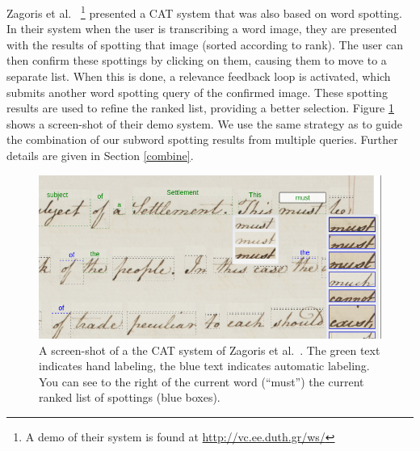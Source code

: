 \documentclass[ms,electronic,twosidetoc,letterpaper,chaptercenter,parttop,lof,lot]{byumsphd}
\begin{document}
Zagoris et al.~\cite{Zagoris2015} \footnote{A demo of their system is found at \url{http://vc.ee.duth.gr/ws/}} presented a CAT system that was also based on word spotting. In their system when the user is transcribing a word image, they are presented with the results of spotting that image (sorted according to rank). The user can then confirm these spottings by clicking on them, causing them to move to a separate list. When this is done, a relevance feedback loop is activated, which submits another word spotting query of the confirmed image. These spotting results are used to refine the ranked list, providing a better selection. Figure \ref{fig:zagoris} shows a screen-shot of their demo system.
We use the same strategy as \cite{Zagoris2015} to guide the combination of our subword spotting results from multiple queries. Further details are given in Section \ref{combine}.

\begin{figure}
    \centering
    \includegraphics[width=.85\textwidth]{zagoris}
    \caption{A screen-shot of a the CAT system of Zagoris et al.~\cite{Zagoris2015}. The green text indicates hand labeling, the blue text indicates automatic labeling. You can see to the right of the current word (``must'') the current ranked list of spottings (blue boxes).}
    \label{fig:zagoris}
\end{figure}
\end{document}
